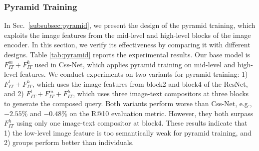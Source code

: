 \documentclass[sigconf]{acmart}
\begin{document}
\begin{table}[ht]
\caption{Quantitative results on the Shoes dataset. The best results are in \textbf{bold}. The symbol $\dagger$ denotes model ensemble method.}
\label{tab:shoes}
\small
\setlength\tabcolsep{18pt}
\end{table}


\subsubsection{Pyramid Training}
\label{subsec:layer2}

In Sec.~\ref{subsubsec:pyramid}, we present the design of the pyramid training, which exploits the image features from the mid-level and high-level blocks of the image encoder. In this section, we verify its effectiveness by comparing it with different designs. Table \ref{tab:pyramid} reports the experimental results. Our base model is $F_{IT}^m+F_{IT}^h$ used in Css-Net, which applies pyramid training on mid-level and high-level features. We conduct experiments on two variants for pyramid training: 1) $F_{IT}^l+F_{IT}^h$, which uses the image features from block2 and block4 of the ResNet, and 2) $F_{IT}^l+F_{IT}^m+F_{IT}^h$, which uses three image-text compositors at three blocks to generate the composed query. Both variants perform worse than Css-Net, e.g., $-2.55\%$ and $-0.48\%$ on the R@10 evaluation metric. However, they both surpass $F_{IT}^h$ using only one image-text compositor at block4. These results indicate that 1) the low-level image feature is too semantically weak for pyramid training, and 2) groups perform better than individuals. 
\end{document}
